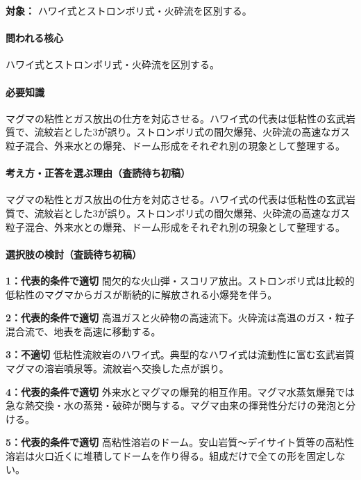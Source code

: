 \noindent\textbf{対象：} ハワイ式とストロンボリ式・火砕流を区別する。\par

\paragraph{問われる核心} ハワイ式とストロンボリ式・火砕流を区別する。

\paragraph{必要知識} マグマの粘性とガス放出の仕方を対応させる。ハワイ式の代表は低粘性の玄武岩質で、流紋岩とした3が誤り。ストロンボリ式の間欠爆発、火砕流の高速なガス粒子混合、外来水との爆発、ドーム形成をそれぞれ別の現象として整理する。

\paragraph{考え方・正答を選ぶ理由（査読待ち初稿）} マグマの粘性とガス放出の仕方を対応させる。ハワイ式の代表は低粘性の玄武岩質で、流紋岩とした3が誤り。ストロンボリ式の間欠爆発、火砕流の高速なガス粒子混合、外来水との爆発、ドーム形成をそれぞれ別の現象として整理する。

\paragraph{選択肢の検討（査読待ち初稿）}\mbox{}\par

\noindent\textbf{1：代表的条件で適切} 間欠的な火山弾・スコリア放出。ストロンボリ式は比較的低粘性のマグマからガスが断続的に解放される小爆発を伴う。\par

\noindent\textbf{2：代表的条件で適切} 高温ガスと火砕物の高速流下。火砕流は高温のガス・粒子混合流で、地表を高速に移動する。\par

\noindent\textbf{3：不適切} 低粘性流紋岩のハワイ式。典型的なハワイ式は流動性に富む玄武岩質マグマの溶岩噴泉等。流紋岩へ交換した点が誤り。\par

\noindent\textbf{4：代表的条件で適切} 外来水とマグマの爆発的相互作用。マグマ水蒸気爆発では急な熱交換・水の蒸発・破砕が関与する。マグマ由来の揮発性分だけの発泡と分ける。\par

\noindent\textbf{5：代表的条件で適切} 高粘性溶岩のドーム。安山岩質～デイサイト質等の高粘性溶岩は火口近くに堆積してドームを作り得る。組成だけで全ての形を固定しない。\par

